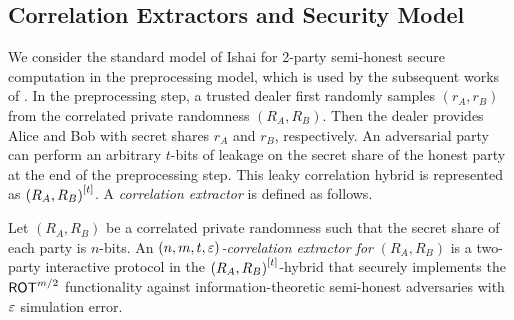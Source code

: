 \subsection{Correlation Extractors and Security Model}\label{sec:intro-corr-ext}
We consider the standard model of Ishai \etal \cite{FOCS:IKOS09} for 2-party semi-honest secure computation in the preprocessing model, which is used by the subsequent works of \cite{C:GIMS15,C:BloMajNgu17,EPRINT:BGMN18,EPRINT:BloMajNgu18}.
In the preprocessing step, a trusted dealer first randomly samples $(r_A, r_B)$ from the correlated private randomness $(R_A,R_B)$.
Then the dealer provides Alice and Bob with secret shares $r_A$ and $r_B$, respectively.
An adversarial party can perform an arbitrary $t$-bits of leakage on the secret share of the honest party at the end of the preprocessing step.
This leaky correlation hybrid is represented as $\left({R_A,R_B}\right)^{[t]}$.
A {\em correlation extractor} is defined as follows.

\begin{definition}\label{def:corr-ext}
	Let $(R_A,R_B)$ be a correlated private randomness such that the secret share of each party is $n$-bits.
	An $(n,m,t,\varepsilon)${\em-correlation extractor for} $(R_A, R_B)$ is a two-party interactive protocol in the $\left({R_A,R_B}\right)^{[t]}$-hybrid that securely implements the $\ROT[m/2]$ functionality against information-theoretic semi-honest adversaries with $\varepsilon$ simulation error.
\end{definition}